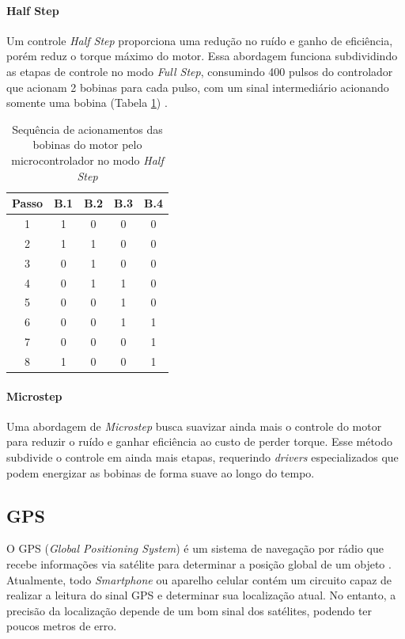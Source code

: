 \paragraph{Half Step}
Um controle \textit{Half Step} proporciona uma redução no ruído e ganho de eficiência, porém reduz o torque máximo do motor. Essa abordagem funciona subdividindo as etapas de controle no modo \textit{Full Step}, consumindo 400 pulsos do controlador que acionam 2 bobinas para cada pulso, com um sinal intermediário acionando somente uma bobina (Tabela \ref{tab:hs}) \cite{man:advancedmicrosystemStepControl}.

\begin{table}[!htb]
	\centering	
	\caption{Sequência de acionamentos das bobinas do motor pelo microcontrolador no modo \textit{Half Step}}
	\begin{tabular}{c|c|c|c|c}
				Passo & B.1 & B.2 & B.3 & B.4 \\\hline
		1	& 1 & 0 & 0 & 0\\
		2	& 1 & 1 & 0 & 0\\
		3	& 0 & 1 & 0 & 0\\
		4	& 0 & 1	& 1 & 0\\
		5	& 0 & 0 & 1 & 0\\
		6	& 0 & 0 & 1 & 1\\
		7	& 0 & 0 & 0 & 1\\
		8	& 1 & 0	& 0 & 1\\
	\end{tabular}
	\label{tab:hs}
\end{table}

\paragraph{Microstep}
Uma abordagem de \textit{Microstep} busca suavizar ainda mais o controle do motor para reduzir o ruído e ganhar eficiência ao custo de perder torque. Esse método subdivide o controle em ainda mais etapas, requerindo \textit{drivers} especializados que podem energizar as bobinas de forma suave ao longo do tempo. 

\subsection{GPS}
O GPS (\textit{Global Positioning System}) é um sistema de navegação por rádio que recebe informações via satélite para determinar a posição global de um objeto \cite{apostilagps}. Atualmente, todo \textit{Smartphone} ou aparelho celular contém um circuito capaz de realizar a leitura do sinal GPS e determinar sua localização atual. No entanto, a precisão da localização depende de um bom sinal dos satélites, podendo ter poucos metros de erro.


